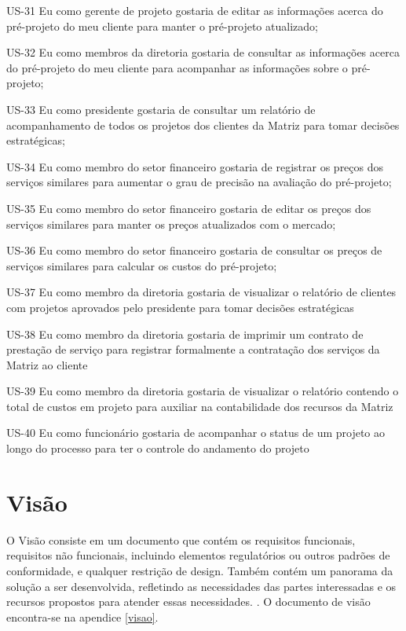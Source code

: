 US-31 Eu como gerente de projeto gostaria de editar as informações acerca do pré-projeto do meu cliente para manter o pré-projeto atualizado;


US-32 Eu como membros da diretoria gostaria de consultar as informações acerca do pré-projeto do meu cliente para acompanhar as informações sobre o pré-projeto;


US-33 Eu como presidente gostaria de consultar um relatório de acompanhamento de todos os projetos dos clientes da Matriz para tomar decisões estratégicas;


US-34 Eu como membro do setor financeiro gostaria de registrar os preços dos serviços similares para aumentar o grau de precisão na avaliação do pré-projeto;


US-35 Eu como membro do setor financeiro gostaria de editar os preços dos serviços similares para manter os preços atualizados com o mercado;


US-36 Eu como membro do setor financeiro gostaria de consultar os preços de serviços similares para calcular os custos do pré-projeto;


US-37 Eu como membro da diretoria gostaria de visualizar o relatório de clientes com projetos aprovados pelo presidente para tomar decisões estratégicas


US-38 Eu como membro da diretoria gostaria de imprimir um contrato de prestação de serviço para registrar formalmente a contratação dos serviços da Matriz ao cliente


US-39 Eu como membro da diretoria gostaria de visualizar o relatório contendo o total de custos em projeto para auxiliar na contabilidade dos recursos da Matriz


US-40 Eu como funcionário gostaria de acompanhar o status de um projeto ao longo do processo para ter o controle do andamento do projeto


\section{Visão}

O Visão consiste em um documento que contém os requisitos funcionais, requisitos não funcionais, incluindo elementos regulatórios 
ou outros padrões de conformidade, e qualquer restrição de design. Também contém um panorama da solução a ser desenvolvida, 
refletindo as necessidades das partes interessadas e os recursos propostos para atender essas necessidades. \cite{safe}. 
O documento de visão encontra-se na apendice \ref{visao}.

